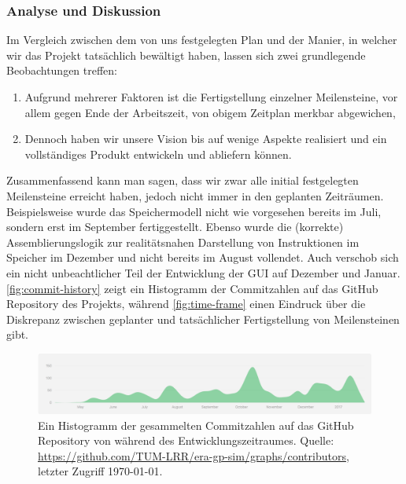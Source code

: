 
\subsubsection{Analyse und Diskussion}
\label{team:orga-plan-anal}

Im Vergleich zwischen dem von uns festgelegten Plan und der Manier, in welcher wir das Projekt tatsächlich bewältigt haben, lassen sich zwei grundlegende Beobachtungen treffen:
\vspace{-0.2cm}
\begin{enumerate}
  \item Aufgrund mehrerer Faktoren ist die Fertigstellung einzelner Meilensteine, vor allem gegen Ende der Arbeitszeit, von obigem Zeitplan merkbar abgewichen,
  \item Dennoch haben wir unsere Vision bis auf wenige Aspekte realisiert und ein vollständiges Produkt entwickeln und abliefern können.
\end{enumerate}

Zusammenfassend kann man sagen, dass wir zwar alle initial festgelegten
Meilensteine erreicht haben, jedoch nicht immer in den geplanten Zeiträumen.
Beispielsweise wurde das Speichermodell nicht wie vorgesehen bereits im Juli,
sondern erst im September fertiggestellt. Ebenso wurde die (korrekte)
Assemblierungslogik zur realitätsnahen Darstellung von Instruktionen im Speicher
im Dezember und nicht bereits im August vollendet. Auch verschob sich ein nicht
unbeachtlicher Teil der Entwicklung der GUI auf Dezember und Januar.
\autoref{fig:commit-history} zeigt ein Histogramm der Commitzahlen auf das
GitHub Repository des Projekts, während \autoref{fig:time-frame} einen Eindruck
über die Diskrepanz zwischen geplanter und tatsächlicher Fertigstellung von
Meilensteinen gibt.

\begin{figure}[b!]
  \centering
  \includegraphics[scale=0.45]{figures/commit-history}
  \caption{Ein Histogramm der gesammelten Commitzahlen auf das GitHub Repository von \erasim{} während des Entwicklungszeitraumes. Quelle: {\small\url{https://github.com/TUM-LRR/era-gp-sim/graphs/contributors}}, letzter Zugriff \today.}
  \label{fig:commit-history}
\end{figure}

